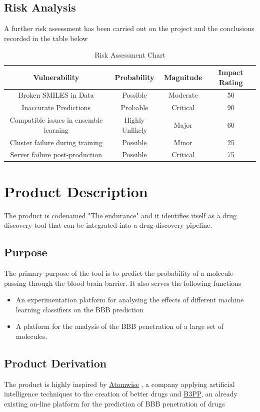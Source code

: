 \documentclass[a4paper,12pt]{article}
\begin{document}
		\subsection{Risk Analysis}
		A further risk assessment has been carried out on the project and the conclusions recorded in the table below
		\begin{table}[ht]
			\caption{Risk Assessment Chart}
			\centering
			\begin{tabular}{c|c|c|c}
				\hline \hline
				Vulnerability & Probability & Magnitude & Impact Rating \\
				\hline
				Broken SMILES in Data & Possible & Moderate & 50 \\
				Inaccurate Predictions & Probable & Critical & 90 \\
				Compatible issues in ensemble learning & Highly Unlikely & Major & 60 \\
				Cluster failure during training & Possible & Minor & 25 \\
				Server failure post-production & Possible & Critical & 75
			\end{tabular}
		\end{table}
	
	
	\section{Product Description}
	The product is codenamed "The endurance" and it identifies itself as a drug discovery tool that can be integrated into a drug discovery pipeline.
		\subsection{Purpose}
		The primary purpose of the tool is to predict the probability of a molecule passing through the blood brain barrier. It also serves the following functions
			\begin{itemize}
				\item An experimentation platform for analysing the effects of different machine learning classifiers on the BBB prediction
				\item A platform for the analysis of the BBB penetration of a large set of molecules.
			\end{itemize}
		\subsection{Product Derivation}
		The product is highly inspired by \href{http://www.atomwise.com/}{Atomwise} , a company applying artificial intelligence techniques to the creation of better drugs and \href{http://b3pp.lasige.di.fc.ul.pt/about.html}{B3PP}, an already existing on-line platform for the prediction of BBB penetration of drugs
\end{document}
